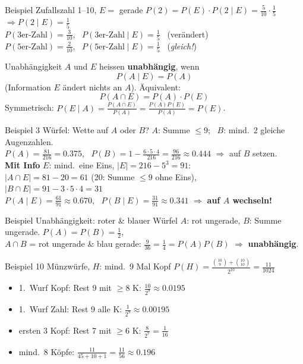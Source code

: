 \documentclass[a4paper, fontsize=7pt]{scrartcl}
\begin{document}
\begin{subbox}{Beispiel Zufallszahl 1--10, $E = $ gerade}
$P(2) = P(E) \cdot P(2 \mid E) = \frac{5}{10} \cdot \frac{1}{5}$
$\Rightarrow P(2 \mid E) = \frac{1}{5}$\\
$P(\text{3er-Zahl}) = \frac{3}{10}$, \ $P(\text{3er-Zahl} \mid E) =
\frac{1}{5}$ \ (verändert)\\
$P(\text{5er-Zahl}) = \frac{2}{10}$, \ $P(\text{5er-Zahl} \mid E) =
\frac{1}{5}$ \ (\emph{gleich!})
\end{subbox}

\begin{mainbox}{Unabhängigkeit}
$A$ und $E$ heissen \textbf{unabhängig}, wenn
$$P(A \mid E) = P(A)$$
(Information $E$ ändert nichts an $A$). Äquivalent:
$$\boxed{P(A \cap E) = P(A) \cdot P(E)}$$
Symmetrisch: $P(E \mid A) = \frac{P(A \cap E)}{P(A)} =
\frac{P(A)P(E)}{P(A)} = P(E)$.
\end{mainbox}

\begin{subbox}{Beispiel 3 Würfel: Wette auf $A$ oder $B$?}
$A$: Summe $\le 9$; \ $B$: mind.\ 2 gleiche Augenzahlen.\\
$P(A) = \frac{81}{216} = 0.375$, \
$P(B) = 1 - \frac{6 \cdot 5 \cdot 4}{216} = \frac{96}{216} \approx 0.444$
$\Rightarrow$ auf $B$ setzen.\\
\textbf{Mit Info} $E$: mind.\ eine Eins, $|E| = 216 - 5^3 = 91$:\\
$|A \cap E| = 81 - 20 = 61$ (20: Summe $\le 9$ ohne Eins),\\
$|B \cap E| = 91 - 3 \cdot 5 \cdot 4 = 31$\\
$P(A \mid E) = \frac{61}{91} \approx 0.670$, \
$P(B \mid E) = \frac{31}{91} \approx 0.341$ $\Rightarrow$ \textbf{auf $A$
wechseln!}
\end{subbox}

\begin{subbox}{Beispiel Unabhängigkeit: roter \& blauer Würfel}
$A$: rot ungerade, $B$: Summe ungerade.
$P(A) = P(B) = \frac{1}{2}$,\\
$A \cap B$ = rot ungerade \& blau gerade: $\frac{9}{36} = \frac{1}{4} =
P(A)P(B)$ $\Rightarrow$ \textbf{unabhängig}.
\end{subbox}

\begin{subbox}{Beispiel 10 Münzwürfe, $H$: mind.\ 9 Mal Kopf}
$P(H) = \frac{\binom{10}{9} + \binom{10}{10}}{2^{10}} = \frac{11}{1024}$
\begin{itemize}
    \item 1.\ Wurf Kopf: Rest 9 mit $\ge 8$ K: $\frac{10}{2^9} \approx 0.0195$
    \item 1.\ Wurf Zahl: Rest 9 alle K: $\frac{1}{2^9} \approx 0.00195$
    \item ersten 3 Kopf: Rest 7 mit $\ge 6$ K: $\frac{8}{2^7} = \frac{1}{16}$
    \item mind.\ 8 Köpfe: $\frac{11}{45 + 10 + 1} = \frac{11}{56} \approx
          0.196$
\end{itemize}
\end{subbox}
\end{document}
